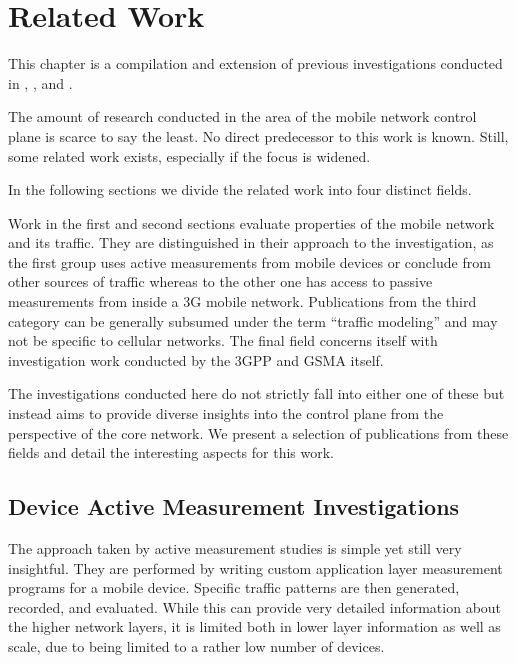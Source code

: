 \section{Related Work}
\label{c4:sec:relwork}


This chapter is a compilation and extension of previous investigations conducted in \cite{metzger2012research}, \cite{metzger2014jcnc}, and \cite{metzger2014lossmodel}. 

The amount of research conducted in the area of the mobile network control plane is scarce to say the least. No direct predecessor to this work is known. Still, some related work exists, especially if the focus is widened.

In the following sections we divide the related work into four distinct fields.

Work in the first and second sections evaluate properties of the mobile network and its traffic. They are distinguished in their approach to the investigation, as the first group uses active measurements from mobile devices or conclude from other sources of traffic whereas to the other one has access to passive measurements from inside a \gls{3G} mobile network. Publications from the third category can be generally subsumed under the term ``traffic modeling'' and may not be specific to cellular networks. The final field concerns itself with investigation work conducted by the \gls{3GPP} and \gls{GSMA} itself.

The investigations conducted here do not strictly fall into either one of these but instead aims to provide diverse insights into the control plane from the perspective of the core network. We present a selection of publications from these fields and detail the interesting aspects for this work.


\subsection{Device Active Measurement Investigations}

The approach taken by active measurement studies is simple yet still very insightful. They are performed by writing custom application layer measurement programs for a mobile device. Specific traffic patterns are then generated, recorded, and evaluated. While this can provide very detailed information about the higher network layers, it is limited both in lower layer information as well as scale, due to being limited to a rather low number of devices.

